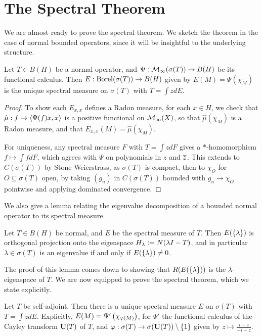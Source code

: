 \documentclass[10pt]{amsart}
\begin{document}
\section{The Spectral Theorem}
We are almost ready to prove the spectral theorem. We sketch the theorem in the case of normal bounded operators, since it will be insightful to the underlying structure.
\begin{theorem}\label{specnorm}
    Let $T \in B(H)$ be a normal operator, and $\Psi : \mathcal{M}_\infty(\sigma(T)) \to B(H)$ be its functional calculus. Then $E : \operatorname{Borel}(\sigma(T)) \to B(H)$ given by $E(M) = \Psi(\chi_M)$ is the unique spectral measure on $\sigma(T)$ with $T = \int z dE$.
\end{theorem}
\begin{proof}
    To show each $E_{x, x}$ defines a Radon measure, for each $x \in H$, we check that $\hat\mu : f \mapsto \left\langle \Psi(f)x, x \right\rangle$ is a positive functional on $\mathcal{M}_\infty(X)$, so that $\hat\mu(\chi_M)$ is a Radon measure, and that $E_{x, x}(M) = \hat\mu(\chi_M)$.

    For uniqueness, any spectral measure $F$ with $T = \int z dF$ gives a $*$-homomorphism $f \mapsto \int f dF$, which agrees with $\Psi$ on polynomials in $z$ and $\overline{z}$. This extends to $C(\sigma(T))$ by Stone-Weierstrass, as $\sigma(T)$ is compact, then to $\chi_O$ for $O \subseteq \sigma(T)$ open, by taking $(g_n)$ in $C(\sigma(T))$ bounded with $g_n \to \chi_O$ pointwise and applying dominated convergence. 
\end{proof}
We also give a lemma relating the eigenvalue decomposition of a bounded normal operator to its spectral measure.
\begin{lemma}\label{bdnormaleigen}
    Let $T \in B(H)$ be normal, and $E$ be the spectral measure of $T$. Then $E(\left\{  \lambda  \right\})$ is orthogonal projection onto the eigenspace $H_\lambda \vcentcolon= N(\lambda I - T)$, and in particular $\lambda \in \sigma(T)$ is an eigenvalue if and only if $E(\left\{  \lambda  \right\}) \neq 0$.
\end{lemma}
The proof of this lemma comes down to showing that $R(E(\left\{  \lambda  \right\}))$ is the $\lambda$-eigenspace of $T$. We are now equipped to prove the spectral theorem, which we state explicitly.
\begin{theorem}\label{specthm}
    Let $T$ be self-adjoint. Then there is a unique spectral measure $E$ on $\sigma(T)$ with $T = \int z dE$. Explicitly, $E(M) = \Psi'\left(  \chi_{\varphi(M)}  \right)$, for $\Psi'$ the functional calculus of the Cayley transform $\mathbf{U}(T)$ of $T$, and $\varphi : \sigma(T) \to \sigma(\mathbf{U}(T)) \setminus \left\{  1  \right\}$ given by $z \mapsto \frac{i - z}{-i - z}$.
\end{theorem}
\end{document}
